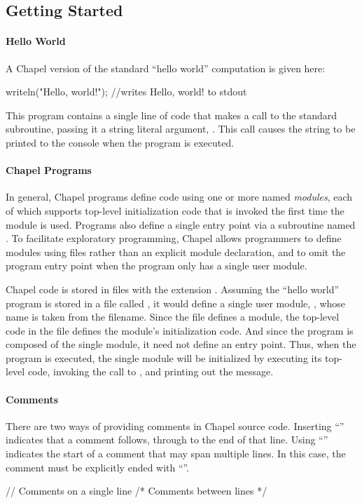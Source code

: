 \subsection{Getting Started}

\paragraph{Hello World} 
A Chapel version of the standard ``hello world'' computation is given
here:
\begin{chapel}
writeln("Hello, world!"); //writes Hello, world! to stdout
\end{chapel}
\noindent This program contains a single line of code that makes a
call to the standard  subroutine, passing it a string
literal argument, .  This call causes the string
to be printed to the console when the program is executed.

\paragraph{Chapel Programs}
In general, Chapel programs define code using one or more named
\emph{modules}, each of which supports top-level initialization code
that is invoked the first time the module is used.  Programs also
define a single entry point via a subroutine named .  To
facilitate exploratory programming, Chapel allows programmers to
define modules using files rather than an explicit module declaration,
and to omit the program entry point when the program only has a single
user module.  

Chapel code is stored in files with the extension .
Assuming the ``hello world'' program is stored in a file called 
, it
would define a single user module, , whose name is taken
from the filename.  Since the file defines a module, the top-level
code in the file defines the module's initialization code.  And since
the program is composed of the single  module, it need not
define an entry point.  Thus, when the program is executed, the single
 module will be initialized by executing its top-level
code, invoking the call to , and printing out the
message.

\paragraph{Comments} 
There are two ways of providing comments in Chapel source code.
Inserting ``\chpl{//}'' indicates that a comment follows, through to  
the end of that line.  Using ``\chpl{/*}'' indicates the start of a comment that
may span multiple lines.  In this case, the comment must be
explicitly ended with ``\chpl{*/}''.
\begin{chapel}
// Comments on a single line
/* Comments
   between lines */
\end{chapel}

